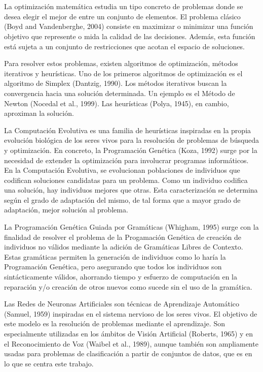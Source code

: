 \documentclass[spanish,a4paper,12pt,twoside]{report}
\begin{document}
  \chapter*{\vspace{-3cm}{\LARGE 1. Introducción}}
  \vspace{-1cm}
  La optimización matemática estudia un tipo concreto de problemas donde se desea elegir el mejor de entre un conjunto de elementos. El problema clásico (Boyd and Vandenberghe, 2004) consiste en maximizar o minimizar una función objetivo que represente o mida la calidad de las decisiones. Además, esta función está sujeta a un conjunto de restricciones que acotan el espacio de soluciones. \par
  Para resolver estos problemas, existen algoritmos de optimización, métodos iterativos y heurísticas. Uno de los primeros algoritmos de optimización es el algoritmo de Simplex (Dantzig, 1990). Los métodos iterativos buscan la convergencia hacia una solución determinada. Un ejemplo es el Método de Newton (Nocedal et al., 1999). Las heurísticas (Polya, 1945), en cambio, aproximan la solución. \par
  La Computación Evolutiva es una familia de heurísticas inspiradas en la propia evolución biológica de los seres vivos para la resolución de problemas de búsqueda y optimización. En concreto, la Programación Genética (Koza, 1992) surge por la necesidad de extender la optimización para involucrar programas informáticos. En la Computación Evolutiva, se evolucionan poblaciones de individuos que codifican soluciones candidatas para un problema. Como un individuo codifica una solución, hay individuos mejores que otras. Esta caracterización se determina según el grado de adaptación del mismo, de tal forma que a mayor grado de adaptación, mejor solución al problema. \par
  La Programación Genética Guiada por Gramáticas (Whigham, 1995) surge con la finalidad de resolver el problema de la Progamación Genética de creación de individuos no válidos mediante la adición de Gramáticas Libres de Contexto. Estas gramáticas permiten la generación de individuos como lo haría la Programación Genética, pero asegurando que todos los individuos son sintácticamente válidos, ahorrando tiempo y esfuerzo de computación en la reparación y/o creación de otros nuevos como sucede sin el uso de la gramática. \par
  Las Redes de Neuronas Artificiales son técnicas de Aprendizaje Automático (Samuel, 1959) inspiradas en el sistema nervioso de los seres vivos. El objetivo de este modelo es la resolución de problemas mediante el aprendizaje. Son especialmente utilizadas en los ámbitos de Visión Artificial (Roberts, 1965) y en el Reconocimiento de Voz (Waibel et al., 1989), aunque también son ampliamente usadas para problemas de clasificación a partir de conjuntos de datos, que es en lo que se centra este trabajo. \par
\end{document}
